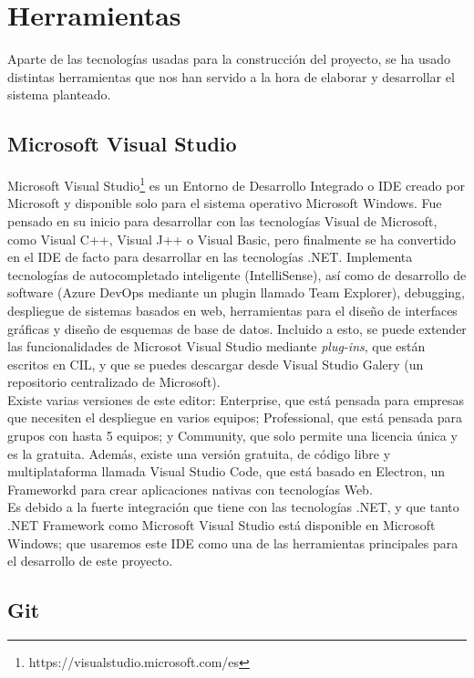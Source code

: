 \section{Herramientas}

Aparte de las tecnologías usadas para la construcción del proyecto, se ha usado distintas herramientas que nos han servido a la hora de elaborar y desarrollar el sistema planteado.

\subsection{Microsoft Visual Studio}

Microsoft Visual Studio\footnote{https://visualstudio.microsoft.com/es} es un Entorno de Desarrollo Integrado o IDE creado por Microsoft y disponible solo para el sistema operativo Microsoft Windows. Fue pensado en su inicio para desarrollar con las tecnologías Visual de Microsoft, como Visual C++, Visual J++ o Visual Basic, pero finalmente se ha convertido en el IDE de facto para desarrollar en las tecnologías .NET. Implementa tecnologías de autocompletado inteligente (IntelliSense\texttrademark), así como de desarrollo de software (Azure DevOps mediante un plugin llamado Team Explorer), debugging, despliegue de sistemas basados en web, herramientas para el diseño de interfaces gráficas y diseño de esquemas de base de datos. Incluido a esto, se puede extender las funcionalidades de Microsot Visual Studio mediante \textit{plug-ins}, que están escritos en CIL, y que se puedes descargar desde Visual Studio Galery (un repositorio centralizado de Microsoft). \\

Existe varias versiones de este editor: Enterprise, que está pensada para empresas que necesiten el despliegue en varios equipos; Professional, que está pensada para grupos con hasta 5 equipos; y Community, que solo permite una licencia única y es la gratuita. Además, existe una versión gratuita, de código libre y multiplataforma llamada Visual Studio Code, que está basado en Electron, un Frameworkd para crear aplicaciones nativas con tecnologías Web. \\

Es debido a la fuerte integración que tiene con las tecnologías .NET, y que tanto .NET Framework como Microsoft Visual Studio está disponible en Microsoft Windows; que usaremos este IDE como una de las herramientas principales para el desarrollo de este proyecto.

\subsection{Git}

